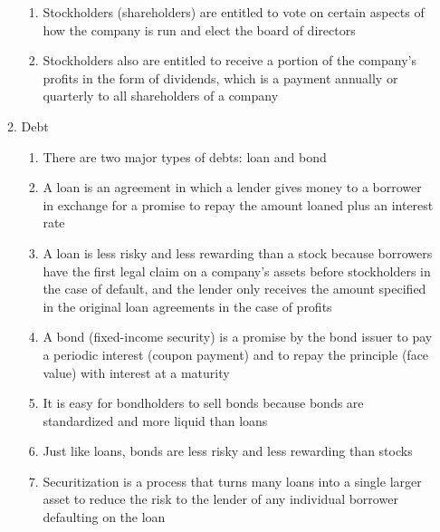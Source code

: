 \documentclass[12pt]{article}
\begin{document}
\begin{enumerate}
\begin{enumerate}
\begin{enumerate}
              \item Stockholders (shareholders) are entitled to vote on certain aspects of how the company is run and elect the board of directors

              \item Stockholders also are entitled to receive a portion of the company's profits in the form of dividends, which is a payment annually or quarterly to all shareholders of a company

            \end{enumerate}

          \item Debt

            \begin{enumerate}

              \item There are two major types of debts: loan and bond

              \item A loan is an agreement in which a lender gives money to a borrower in exchange for a promise to repay the amount loaned plus an interest rate

              \item A loan is less risky and less rewarding than a stock because borrowers have the first legal claim on a company's assets before stockholders in the case of default, and the lender only receives the amount specified in the original loan agreements in the case of profits
                
              \item A bond (fixed-income security) is a promise by the bond issuer to pay a periodic interest (coupon payment) and to repay the principle (face value) with interest at a maturity

              \item It is easy for bondholders to sell bonds because bonds are standardized and more liquid than loans

              \item Just like loans, bonds are less risky and less rewarding than stocks

              \item Securitization is a process that turns many loans into a single larger asset to reduce the risk to the lender of any individual borrower defaulting on the loan

            \end{enumerate}


\end{enumerate}
\end{enumerate}
\end{document}
